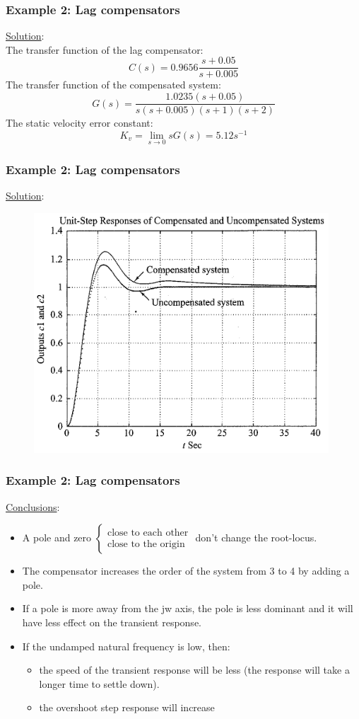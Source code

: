 \begin{frame}
	\frametitle{Example 2: Lag compensators}
	\underline{Solution}:\\
	The transfer function of the lag compensator: 
	$$C(s)=0.9656\frac{s+0.05}{s+0.005}$$
	The transfer function of the compensated system:
	$$G(s)=\frac{1.0235(s+0.05)}{s(s+0.005)(s+1)(s+2)}$$
	The static velocity error constant:
	$$K_v=\lim_{s\to 0}sG(s)=5.12s^{-1}$$
\end{frame}

\begin{frame}
	\frametitle{Example 2: Lag compensators}
	\underline{Solution}:
	\begin{figure}
		\centering
		\includegraphics[width=0.65\linewidth]{Ex2_response}
	\end{figure}
\end{frame}

\begin{frame}
	\frametitle{Example 2: Lag compensators}
	\underline{Conclusions}:
	\begin{itemize}
		\item A pole and zero 
		$\begin{cases} \text{close to each other} \\ \text{close to the origin} \end{cases}$ don't change the root-locus.
		\item The compensator increases the order of the system from 3 to 4 by adding a pole. 
		\item If a pole is more away from the jw axis, the pole is less dominant and it will have less effect on the transient response.
		\item If the undamped natural frequency is low, then:
		\begin{itemize}
			\item the speed of the transient response will be less (the response will take a longer time to settle down).
			\item the overshoot step response will increase
		\end{itemize}
	\end{itemize}
\end{frame}

